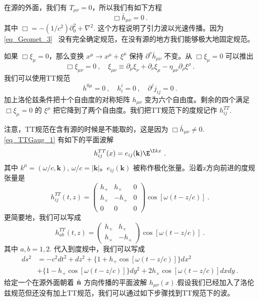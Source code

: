 
\begin{issues}
\issueNeedCite
\issueMissDepend
\end{issues}

在源的外面，我们有 $T_{\mu\nu} = 0$，所以我们有如下方程
\begin{equation}\label{eq_TTGaug_1}
\Box \bar h_{\mu\nu} = 0 ~.
\end{equation}
其中 $\Box = - (1/c^2) \partial_0^2 +\nabla^2$. 这个方程说明了引力波以光速传播。因为\autoref{eq_Geomet_3}~ 没有完全确定规范，在没有源的地方我们能够极大地固定规范。

如果 $\Box \xi_\mu = 0$，那么变换 $x^\mu \rightarrow x^\mu+\xi^\mu$ 保持 $\partial^\nu \bar h_{\mu\nu}$ 不变。从 $\Box \xi_\mu = 0$ 可以推出
\begin{equation}
\Box \xi_{\mu\nu} = 0~, \quad \xi_{\mu\nu} \equiv \partial_{\mu} \xi_\nu +\partial_\nu \xi_\mu - \eta_{\mu\nu} \partial_\rho\xi^\rho~. 
\end{equation}
我们可以使用TT规范
\begin{equation}
h^{0\mu} = 0~, \quad h^i_i = 0~, \quad \partial^j j_{ij} = 0~.
\end{equation}
加上洛伦兹条件把十个自由度的对称矩阵 $h_{\mu\nu}$ 变为六个自由度。剩余的四个满足 $\Box \xi_\mu = 0$ 的 $\xi^\mu$ 把它降到了两个自由度。我们把TT规范下的度规记作 $h_{ij}^{TT}$. 

注意，TT规范在含有源的时候是不能取的，这是因为 $\Box \bar h_{\mu\nu} \neq 0$. \autoref{eq_TTGaug_1} 有如下的平面波解
\begin{equation}
h_{ij}^{TT} (x) = e_{ij} (\mathbf k) \E^{\I kx} ~.  
\end{equation}
其中 $k^\mu = (\omega/c,\mathbf k)$, $\omega/c = |\mathbf k|$。$e_{ij}(\mathbf k)$ 被称作极化张量。沿着z方向前进的度规张量是
\begin{equation}
h_{ij}^{TT} (t,z) = 
\begin{pmatrix}
h_+ & h_\times & 0 \\
h_\times & - h_+ & 0 \\
0 & 0 & 0
\end{pmatrix} \cos [\omega (t - z/c)]~. 
\end{equation}
更简要地，我们可以写成
\begin{equation}\label{eq_TTGaug_2}
h_{ab}^{TT} (t,z) = 
\begin{pmatrix}
h_+ & h_\times   \\
h_\times & - h_+   
\end{pmatrix} \cos [\omega (t - z/c)]~. 
\end{equation}
其中 $a,b = 1,2$. 代入到度规中，我们可以写成
\begin{equation}
\begin{aligned}
ds^2 & = - c^2 dt^2 + dz^2 + \{ 1+ h_+ \cos [\omega(t-z/c)] \} dx^2 \\
& + \{ 1-h_+ \cos [\omega(t-z/c)] \} dy^2 + 2 h_\times \cos[\omega(t-z/c)] dx dy~.
\end{aligned}
\end{equation}
给定一个在源外面朝着 $\hat{\bf{n}}$ 方向传播的平面波解 $h_{\mu\nu}(x)$.假设我们已经加入了洛伦兹规范但还没有加上TT规范，我们可以通过如下步骤找到TT规范下的波。

